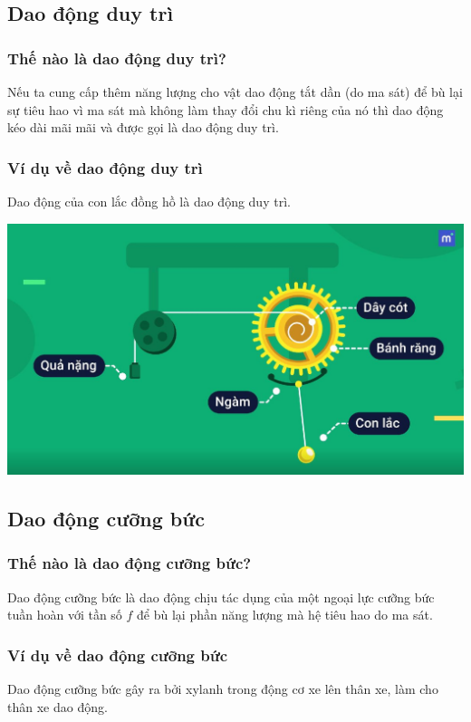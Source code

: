 \subsection{Dao động duy trì}
\subsubsection{Thế nào là dao động duy trì?}
Nếu ta cung cấp thêm năng lượng cho vật dao động tắt dần (do ma sát) để bù lại sự tiêu hao vì ma sát mà không làm thay đổi chu kì riêng của nó thì dao động kéo dài mãi mãi và được gọi là dao động duy trì.
\subsubsection{Ví dụ về dao động duy trì}
Dao động của con lắc đồng hồ là dao động duy trì.
\begin{center}
	\includegraphics[scale=0.3]{../figs/VN12-PH-05-L-004-1-V2-01}
\end{center}
\subsection{Dao động cưỡng bức}
\subsubsection{Thế nào là dao động cưỡng bức?}
Dao động cưỡng bức là dao động chịu tác dụng của một ngoại lực cưỡng bức tuần hoàn với tần số $f$ để bù lại phần năng lượng mà hệ tiêu hao do ma sát.
\subsubsection{Ví dụ về dao động cưỡng bức}
Dao động cưỡng bức gây ra bởi xylanh trong động cơ xe lên thân xe, làm cho thân xe dao động.
